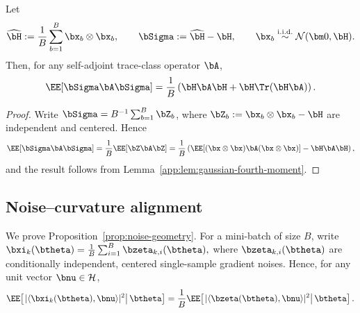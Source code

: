 \documentclass[11pt]{article}
\begin{document}
\begin{corollary}
\label{app:cor:gaussian-empirical-covariance}
Let
\[
\widehat{\bH}:=\frac1B\sum_{b=1}^B\bx_b\otimes\bx_b,
\qquad
\bSigma:=\widehat{\bH}-\bH,
\qquad
\bx_b\overset{\mathrm{i.i.d.}}{\sim}\mathcal N(\bm0,\bH).
\]
Then, for any self-adjoint trace-class operator \(\bA\),
\begin{equation}
\label{app:eq:gaussian-empirical-covariance}
\EE[\bSigma\bA\bSigma]
=
\frac1B\left(\bH\bA\bH+\bH\Tr(\bH\bA)\right).
\end{equation}
\end{corollary}

\begin{proof}
Write \(\bSigma=B^{-1}\sum_{b=1}^B\bZ_b\), where \(\bZ_b:=\bx_b\otimes\bx_b-\bH\) are independent and centered. Hence
\[
\EE[\bSigma\bA\bSigma]
=
\frac1B\EE[\bZ\bA\bZ]
=
\frac1B\left(\EE[(\bx\otimes\bx)\bA(\bx\otimes\bx)]-\bH\bA\bH\right),
\]
and the result follows from Lemma~\ref{app:lem:gaussian-fourth-moment}.
\end{proof}



\subsection{Noise--curvature alignment}
\label{app:hessian alignment}

We prove Proposition~\ref{prop:noise-geometry}. For a mini-batch of size \(B\), write
$
\bxi_k(\btheta)=\frac1B\sum_{i=1}^B\bzeta_{k,i}(\btheta),
$
where \(\bzeta_{k,i}(\btheta)\) are conditionally independent, centered single-sample gradient noises. Hence, for any unit vector \(\bnu\in\mathcal H\),
\[
\EE\!\left[\left.|\langle\bxi_k(\btheta),\bnu\rangle|^2\right|\btheta\right]
=
\frac1B\EE\!\left[\left.|\langle\bzeta(\btheta),\bnu\rangle|^2\right|\btheta\right].
\]
\end{document}
